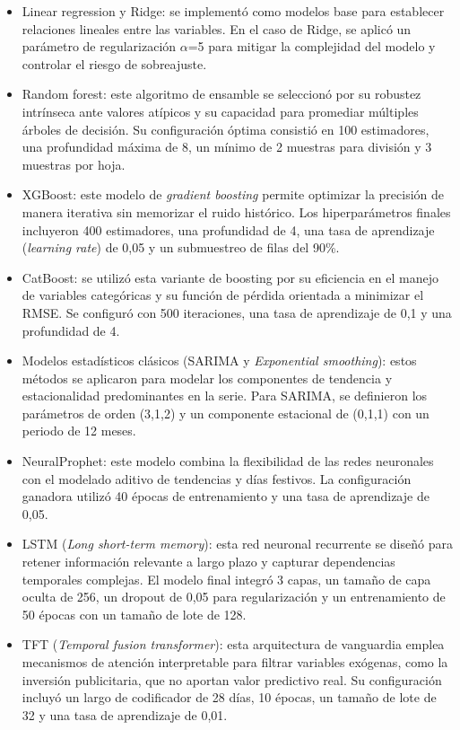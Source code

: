 \begin{itemize}

	\item Linear regression y Ridge: se implementó como modelos base para establecer relaciones lineales entre las variables. En el caso de Ridge, se aplicó un parámetro de regularización $\alpha$=5 para mitigar la complejidad del modelo y controlar el riesgo de sobreajuste.

	\item Random forest: este algoritmo de ensamble se seleccionó por su robustez intrínseca ante valores atípicos y su capacidad para promediar múltiples árboles de decisión. Su configuración óptima consistió en 100 estimadores, una profundidad máxima de 8, un mínimo de 2 muestras para división y 3 muestras por hoja.

	\item XGBoost: este modelo de \textit{gradient boosting} permite optimizar la precisión de manera iterativa sin memorizar el ruido histórico. Los hiperparámetros finales incluyeron 400 estimadores, una profundidad de 4, una tasa de aprendizaje (\textit{learning rate}) de 0,05 y un submuestreo de filas del 90\%.
	
	\item CatBoost: se utilizó esta variante de boosting por su eficiencia en el manejo de variables categóricas y su función de pérdida orientada a minimizar el RMSE. Se configuró con 500 iteraciones, una tasa de aprendizaje de 0,1 y una profundidad de 4.
	\item Modelos estadísticos clásicos (SARIMA \citep{boxjenkins1970} y \textit{Exponential smoothing}): estos métodos se aplicaron para modelar los componentes de tendencia y estacionalidad predominantes en la serie. Para SARIMA, se definieron los parámetros de orden (3,1,2) y un componente estacional de (0,1,1) con un periodo de 12 meses.
	\item NeuralProphet: este modelo combina la flexibilidad de las redes neuronales con el modelado aditivo de tendencias y días festivos. La configuración ganadora utilizó 40 épocas de entrenamiento y una tasa de aprendizaje de 0,05.
	\item LSTM (\textit{Long short-term memory}): esta red neuronal recurrente se diseñó para retener información relevante a largo plazo y capturar dependencias temporales complejas. El modelo final integró 3 capas, un tamaño de capa oculta de 256, un dropout de 0,05 para regularización y un entrenamiento de 50 épocas con un tamaño de lote de 128.
	\item TFT (\textit{Temporal fusion transformer}): esta arquitectura de vanguardia emplea mecanismos de atención interpretable para filtrar variables exógenas, como la inversión publicitaria, que no aportan valor predictivo real. Su configuración incluyó un largo de codificador de 28 días, 10 épocas, un tamaño de lote de 32 y una tasa de aprendizaje de 0,01.
	
\end{itemize}


